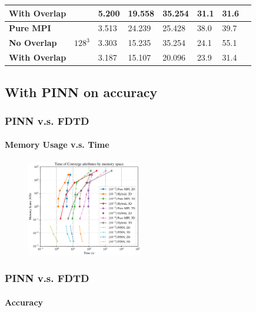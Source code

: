 \begin{frame}
\begin{center}
\begin{tabular}{p{2.5cm} p{1cm} p{1.5cm} p{1.5cm} p{1.5cm} p{1.5cm} p{1cm} p{1cm}}
          \bfseries With Overlap  &                               & 5.200  & 19.558              &  35.254                    & 31.1 & 31.6 \\
          \midrule
          \bfseries Pure MPI      & \multirow{3}{*}{$128^3$}      & 3.513  & 24.239              &  25.428                    & 38.0 & 39.7 \\
          \bfseries No Overlap    &                               & 3.303  & 15.235              &  35.254                    & 24.1 & 55.1 \\
          \bfseries With Overlap  &                               & 3.187  & 15.107              &  20.096                    & 23.9 & 31.4 \\
          \bottomrule
        \end{tabular}
      \end{center}
  

\end{frame}






\subsection{With PINN on accuracy}
\begin{frame}
  \frametitle{PINN v.s. FDTD}
  \framesubtitle{Memory Usage v.s. Time}

  
  \begin{figure}[htbp]
    \centering
    \includegraphics[width=0.45\textwidth]{figure/FIG_Benchmark_Time_Tol.pdf}
    \caption{
    }
    \label{FIG:Benchmark:TimeTol}
  \end{figure}
\end{frame}

\begin{frame}
  \frametitle{PINN v.s. FDTD}
  \framesubtitle{Accuracy}

  

\end{frame}